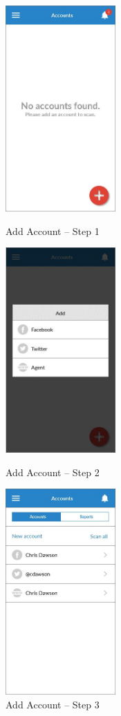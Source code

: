 \begin{figure}
  \subfigures
  \centering
  \begin{minipage}{4.6cm}
    \centering
    \includegraphics[width=4.2cm]{inc/ui_addacc_step1.jpg}
    \caption{Add Account -- Step 1}
    \label{fig:ui_addacc_step1}
  \end{minipage}
  \begin{minipage}{4.6cm}
    \centering
    \includegraphics[width=4.2cm]{inc/ui_addacc_step2.jpg}
    \caption{Add Account -- Step 2}
    \label{fig:ui_addacc_step2}
  \end{minipage}
  \begin{minipage}{4.6cm}
    \centering
    \includegraphics[width=4.2cm]{inc/ui_addacc_step3.jpg}
    \caption{Add Account -- Step 3}
    \label{fig:ui_addacc_step3}
  \end{minipage}
\end{figure}

